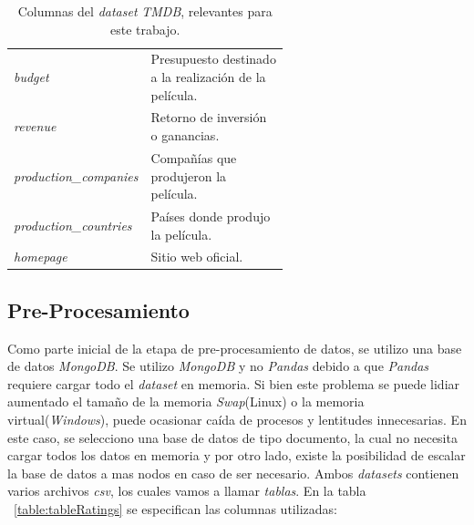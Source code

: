 \documentclass[11pt,a4paper,twoside]{thesis}
\begin{document}
\begin{table}[!htb]
\begin{tabular}{l | p{0.6\linewidth}}
		\textit{budget}                           & Presupuesto destinado a la realización de la película.                                \\
		\textit{revenue}                          & Retorno de inversión o ganancias.                                                     \\
		\textit{production\_companies}            & Compañías que produjeron la película.                                                 \\
		\textit{production\_countries}            & Países donde produjo la película.                                                     \\
		\textit{homepage}                         & Sitio web oficial.                                                                    \\

		\hline
	\end{tabular}
	\caption{
		Columnas del \textit{dataset} \textit{TMDB}, relevantes para este trabajo.
	}
	\label{table:tmdbColumns}
\end{table}

\clearpage

\subsection{Pre-Procesamiento}

Como parte inicial de la etapa de pre-procesamiento de datos, se utilizo una
base de datos \textit{MongoDB}. Se utilizo \textit{MongoDB} y no
\textit{Pandas} debido a que \textit{Pandas} requiere cargar todo el
\textit{dataset} en memoria. Si bien este problema se puede lidiar aumentado el
tamaño de la memoria \textit{Swap}(Linux) o la memoria
virtual(\textit{Windows}), puede ocasionar caída de procesos y lentitudes
innecesarias. En este caso, se selecciono una base de datos de tipo documento,
la cual no necesita cargar todos los datos en memoria y por otro lado, existe
la posibilidad de escalar la base de datos a mas nodos en caso de ser
necesario. Ambos \textit{datasets} contienen varios archivos \textit{csv}, los
cuales vamos a llamar \textit{tablas}. En la tabla ~\ref{table:tableRatings} se
especifican las columnas utilizadas:
\end{document}
